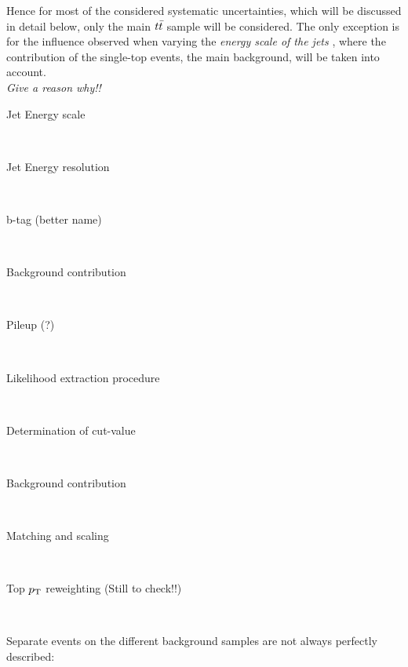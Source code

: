Hence for most of the considered systematic uncertainties, which will be discussed in detail below, only the main $t\bar{t}$ sample will be considered. 
The only exception is for the influence observed when varying the \textit{energy scale of the jets }, where the contribution of the single-top events, the main background, will be taken into account.
\\
\textit{Give a reason why!!}

\begin{myindentpar}
  \begin{description}
    \item[Jet Energy scale] \hfill \\
    
    \item[Jet Energy resolution] \hfill \\
    
    \item[b-tag (better name)] \hfill \\
    
    \item[Background contribution] \hfill \\
        
    \item[Pileup (?)] \hfill \\
        
    \item[Likelihood extraction procedure] \hfill \\
        
    \item[Determination of cut-value] \hfill \\
        
    \item[Background contribution] \hfill \\
        
    \item[Matching and scaling] \hfill \\
        
    \item[Top $p_{\rm T}$ reweighting (Still to check!!)] \hfill \\
        
   \end{description}
\end{myindentpar}

Separate events on the different background samples are not always perfectly described:


